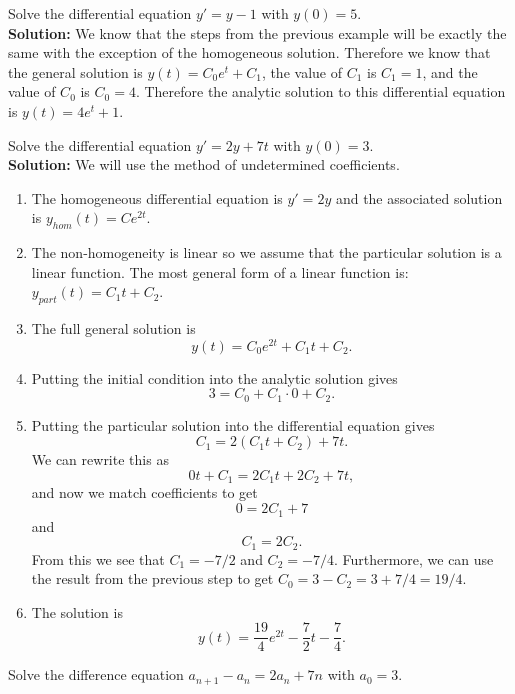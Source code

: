\begin{example}
    Solve the differential equation $y' = y - 1$ with $y(0) = 5$.  \\{\bf Solution:} We
    know that the steps from the previous example will be exactly the same with the
    exception of the homogeneous solution.  Therefore we know that the general solution is
    $y(t) = C_0 e^{t} + C_1$, the value of $C_1$ is $C_1 = 1$, and the value of $C_0$ is
    $C_0 = 4$.  Therefore the analytic solution to this differential equation is $y(t) = 4 e^t + 1$.
\end{example}

\begin{example}
    Solve the differential equation $y' = 2y + 7t$ with $y(0) = 3$. \\{\bf Solution:} We
    will use the method of undetermined coefficients.  
    \begin{enumerate}
        \item The homogeneous differential equation is $y' = 2y$ and the associated
            solution is $y_{hom}(t) = Ce^{2t}$.  
        \item The non-homogeneity is linear so we assume that the particular solution is a
            linear function.  The most general form of a linear function is: $y_{part}(t)
            = C_1 t + C_2$.
        \item The full general solution is
            \[ y(t) = C_0 e^{2t} + C_1 t + C_2. \]
        \item Putting the initial condition into the analytic solution gives 
            \[ 3 = C_0 + C_1 \cdot 0 + C_2. \]
        \item Putting the particular solution into the differential equation gives
            \[ C_1 = 2(C_1t + C_2) + 7t. \]
            We can rewrite this as 
            \[ 0t + C_1 = 2C_1 t + 2C_2 + 7t, \]
            and now we match coefficients to get
            \[ 0 = 2C_1 + 7 \]
            and 
            \[ C_1 = 2C_2. \]
            From this we see that $C_1 = -7/2$ and $C_2 = -7/4.$  Furthermore, we can use
            the result from the previous step to get $C_0 = 3 - C_2 = 3 + 7/4 = 19/4.$
        \item The solution is
            \[ y(t) = \frac{19}{4} e^{2t} - \frac{7}{2} t - \frac{7}{4}. \]
    \end{enumerate}
\end{example}

\begin{problem}
    Solve the difference equation $a_{n+1} - a_n = 2a_n + 7n$ with $a_0 = 3$.
\end{problem}


